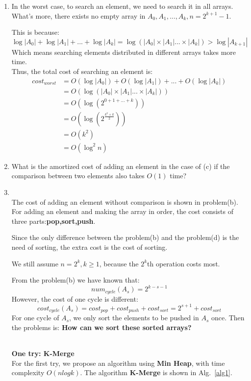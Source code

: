 \documentclass[12pt,a4paper]{article}
\makeatletter
\newtheorem*{solution}{Solution}
\theoremstyle{definition}
\renewenvironment{solution}[1][Solution] {\par\pushQED{\qed}\normalfont\topsep6\p@\@plus6\p@\relax\trivlist\item[\hskip\labelsep\bfseries#1\@addpunct{.}]\ignorespaces}{\popQED\endtrivlist\@endpefalse} \makeatother
\makeatother
\begin{document}
\begin{enumerate}
\begin{enumerate}
\begin{solution}
        In the worst case, to search an element, we need to search it in all arrays.  What's more, there exists no empty array in $A_0, A_1,...,A_k,n=2^{k+1}-1$.
        
        This is because:
        $$
        \log|A_0| + \log|A_1| + ... + \log|A_k| = \log(|A_0|\times|A_1|...\times|A_k|)>\log|A_{k+1}|
        $$
        Which means searching elements distributed in different arrays takes more time.
        ~\\
        
        Thus, the total cost of searching an element is:
        $$
        \begin{aligned}
        cost_{worst} &= O(\log|A_0|) + O(\log|A_1|)+...+O(\log|A_k|)\\
        &=O(\log(|A_0|\times|A_1|...\times |A_k|))\\
        &=O(\log(2^{0+1+...+k})) \\
        &=O(\log(2^{\frac{k^2+k}{2}}))\\
        &=O(k^2)\\
        &=O(\log^2n)
        \end{aligned}
        $$
        \end{solution}
\item What is the amortized cost of adding an element in the case of (c) if the comparison between two elements also takes $O(1)$ time?
\begin{solution}
~\\
The cost of adding an element without comparison is shown in problem(b). For adding an element and making the array in order, the cost consists of three parts:\textbf{pop,sort,push}.

Since the only difference between the problem(b) and the problem(d) is the need of sorting, the extra cost is the cost of sorting.

We still assume $n=2^k,k\geq1$, because the $2^k$th operation costs most.

From the problem(b) we have known that:
$$
num_{cycle}(A_s) = 2^{k-s-1}
$$
However, the cost of one cycle is different:
$$
cost_{cycle}(A_s) = cost_{pop} + cost_{push} + cost_{sort} = 2^{s+1} + cost_{sort}
$$
For one cycle of $A_s$, we only sort the elements to be pushed in $A_s$ once. Then the problems is: \textbf{How can we sort these sorted arrays?}

~\\
\textbf{One try: K-Merge}
~\\
For the first try, we propose an algorithm using \textbf{Min Heap}, with time complexity $O(nlogk)$. The algorithm \textbf{K-Merge} is shown in Alg.~\ref{alg1}.


\end{solution}
\end{enumerate}
\end{enumerate}
\end{document}
